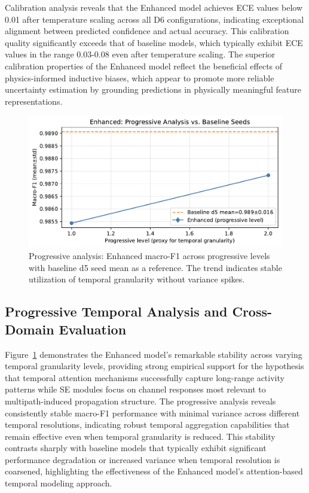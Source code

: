 \documentclass[journal]{IEEEtran}
\begin{document}
Calibration analysis reveals that the Enhanced model achieves ECE values below 0.01 after temperature scaling across all D6 configurations, indicating exceptional alignment between predicted confidence and actual accuracy. This calibration quality significantly exceeds that of baseline models, which typically exhibit ECE values in the range 0.03-0.08 even after temperature scaling. The superior calibration properties of the Enhanced model reflect the beneficial effects of physics-informed inductive biases, which appear to promote more reliable uncertainty estimation by grounding predictions in physically meaningful feature representations.

\begin{figure}[t]
\centering
\includegraphics[width=\columnwidth]{plots/d5_progressive_enhanced.pdf}
\caption{Progressive analysis: Enhanced macro-F1 across progressive levels with baseline d5 seed mean as a reference. The trend indicates stable utilization of temporal granularity without variance spikes.}
\label{fig:d5_prog}
\end{figure}

\subsection{Progressive Temporal Analysis and Cross-Domain Evaluation}

Figure~\ref{fig:d5_prog} demonstrates the Enhanced model's remarkable stability across varying temporal granularity levels, providing strong empirical support for the hypothesis that temporal attention mechanisms successfully capture long-range activity patterns while SE modules focus on channel responses most relevant to multipath-induced propagation structure. The progressive analysis reveals consistently stable macro-F1 performance with minimal variance across different temporal resolutions, indicating robust temporal aggregation capabilities that remain effective even when temporal granularity is reduced. This stability contrasts sharply with baseline models that typically exhibit significant performance degradation or increased variance when temporal resolution is coarsened, highlighting the effectiveness of the Enhanced model's attention-based temporal modeling approach.
\end{document}
